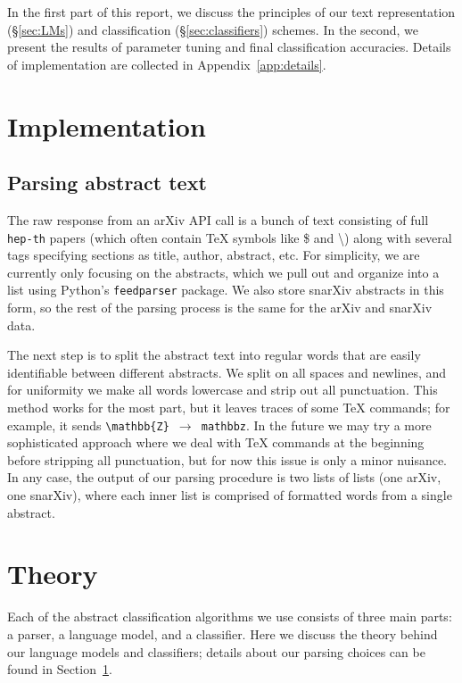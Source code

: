 \documentclass{article}
\begin{document}
In the first part of this report, we discuss the principles of our text representation (\S\ref{sec:LMs}) and classification (\S\ref{sec:classifiers}) schemes. In the second, we present the results of parameter tuning and final classification accuracies. Details of implementation are collected in Appendix~\ref{app:details}.


\section{Implementation} \label{sec:implementation} %
\subsection{Parsing abstract text}
The raw response from an arXiv API call is a bunch of text consisting of full \texttt{hep-th} papers (which often contain TeX symbols like \$ and  \textbackslash) along with several tags specifying sections as title, author, abstract, etc.
For simplicity, we are currently only focusing on the abstracts, which we pull out and organize into a list using Python's \texttt{feedparser} package.
We also store snarXiv abstracts in this form, so the rest of the parsing process is the same for the arXiv and snarXiv data.

The next step is to split the abstract text into regular words that are easily identifiable between different abstracts.
We split on all spaces and newlines, and for uniformity we make all words lowercase and strip out all punctuation.
This method works for the most part, but it leaves traces of some TeX commands; for example, it sends \texttt{\textbackslash mathbb\{Z\} $\to$ mathbbz}.
In the future we may try a more sophisticated approach where we deal with TeX commands at the beginning before stripping all punctuation, but for now this issue is only a minor nuisance.
In any case, the output of our parsing procedure is two lists of lists (one arXiv, one snarXiv), where each inner list is comprised of formatted words from a single abstract.


\section{Theory} \label{sec:theory}
Each of the abstract classification algorithms we use consists of three main parts: a parser, a language model, and a classifier.
Here we discuss the theory behind our language models and classifiers; details about our parsing choices can be found in Section~\ref{sec:implementation}.
 
\end{document}
